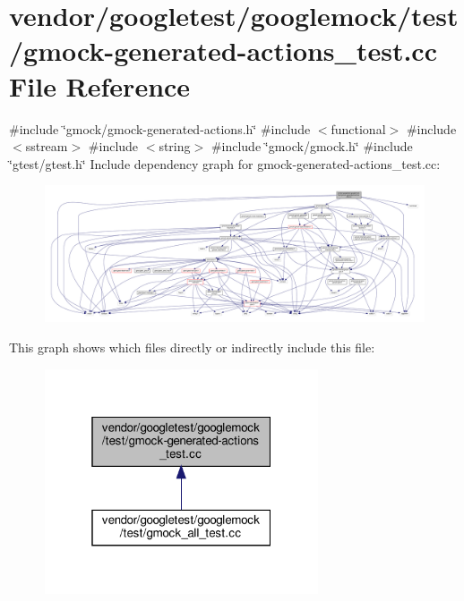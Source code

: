 \hypertarget{gmock-generated-actions__test_8cc}{}\section{vendor/googletest/googlemock/test/gmock-\/generated-\/actions\+\_\+test.cc File Reference}
\label{gmock-generated-actions__test_8cc}
{\ttfamily \#include \char`\"{}gmock/gmock-\/generated-\/actions.\+h\char`\"{}}\newline
{\ttfamily \#include $<$functional$>$}\newline
{\ttfamily \#include $<$sstream$>$}\newline
{\ttfamily \#include $<$string$>$}\newline
{\ttfamily \#include \char`\"{}gmock/gmock.\+h\char`\"{}}\newline
{\ttfamily \#include \char`\"{}gtest/gtest.\+h\char`\"{}}\newline
Include dependency graph for gmock-\/generated-\/actions\+\_\+test.cc\+:
\nopagebreak
\begin{figure}[H]
\begin{center}
\leavevmode
\includegraphics[width=350pt]{gmock-generated-actions__test_8cc__incl}
\end{center}
\end{figure}
This graph shows which files directly or indirectly include this file\+:
\nopagebreak
\begin{figure}[H]
\begin{center}
\leavevmode
\includegraphics[width=229pt]{gmock-generated-actions__test_8cc__dep__incl}
\end{center}
\end{figure}
